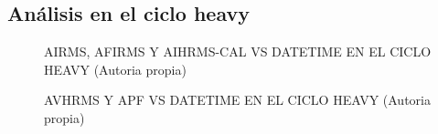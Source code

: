 \subsection{Análisis en el ciclo heavy}
\begin{figure}[H]
  \hfill
  \hfill
  \hfill
  \caption{AIRMS, AFIRMS Y AIHRMS-CAL VS DATETIME EN EL CICLO HEAVY (Autoria propia)}
  \end{figure}
\begin{figure}[H]
  \hfill
  \hfill
  \hfill
  \caption{AVHRMS Y APF VS DATETIME EN EL CICLO HEAVY (Autoria propia)}
  \end{figure}
